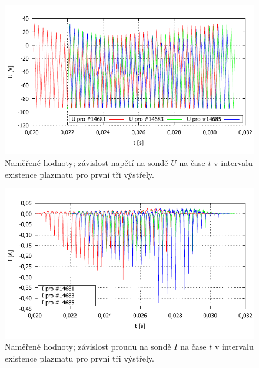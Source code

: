 \documentclass[english]{article}
\begin{document}
%
	\begin{figure}[h!]
	\begin{center}
	    \vspace*{-1cm}
		\includegraphics[width=\linewidth]{../gnuplot/135_merge_3.pdf}
	    \vspace*{-1,5cm}
		\caption{Naměřené hodnoty; závislost napětí na sondě $U$ na čase $t$ v intervalu existence plazmatu pro první tři výstřely.} 
		\label{fig:g_3U}
	\end{center}
	\end{figure}
%
	\begin{figure}[h!]
	\begin{center}
	    \vspace*{-1cm}
		\includegraphics[width=\linewidth]{../gnuplot/135_merge_1.pdf}
	    \vspace*{-1,5cm}
		\caption{Naměřené hodnoty; závislost proudu na sondě $I$ na čase $t$ v intervalu existence plazmatu pro první tři výstřely.} 
		\label{fig:g_3I}
	\end{center}
	\end{figure}
\end{document}
